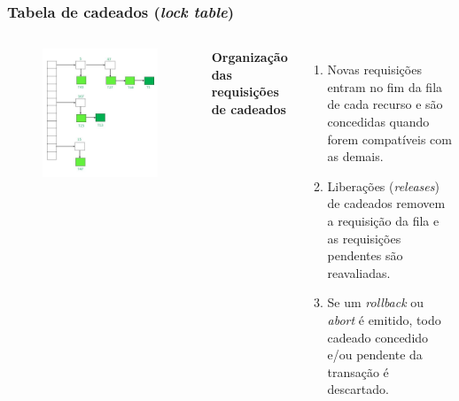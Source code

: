 \documentclass{beamer}
\begin{document}
    
    
\begin{frame}
    \frametitle{Tabela de cadeados (\emph{lock table})}
    \begin{columns}[c] %
    
        \begin{figure}
            \includegraphics[width=0.8\linewidth]{locktable.jpg}
        \end{figure}
    
    
        \textbf{Organização das requisições de cadeados}
        \begin{enumerate}
            \item Novas requisições entram no fim da fila de cada recurso e são concedidas quando forem compatíveis com as demais.
            \item Liberações (\emph{releases}) de cadeados removem a requisição da fila e as requisições pendentes são reavaliadas.
            \item Se um \emph{rollback} ou \emph{abort} é emitido, todo cadeado concedido e/ou pendente da transação é descartado.
        \end{enumerate}
        \end{columns}
\end{frame}
\end{document}
